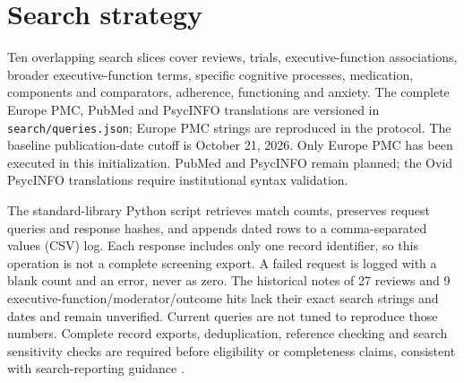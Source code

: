 \section{Search strategy}
\label{sec:search}
Ten overlapping search slices cover reviews, trials, executive-function associations, broader executive-function terms, specific cognitive processes, medication, components and comparators, adherence, functioning and anxiety.
The complete Europe PMC, PubMed and PsycINFO translations are versioned in \texttt{search/queries.json}; Europe PMC strings are reproduced in the protocol.
The baseline publication-date cutoff is October 21, 2026.
Only Europe PMC has been executed in this initialization.
PubMed and PsycINFO remain planned; the Ovid PsycINFO translations require institutional syntax validation.

The standard-library Python script retrieves match counts, preserves request queries and response hashes, and appends dated rows to a comma-separated values (CSV) log.
Each response includes only one record identifier, so this operation is not a complete screening export.
A failed request is logged with a blank count and an error, never as zero.
The historical notes of 27 reviews and 9 executive-function/moderator/outcome hits lack their exact search strings and dates and remain unverified.
Current queries are not tuned to reproduce those numbers.
Complete record exports, deduplication, reference checking and search sensitivity checks are required before eligibility or completeness claims, consistent with search-reporting guidance \citep{Rethlefsen2021}.

